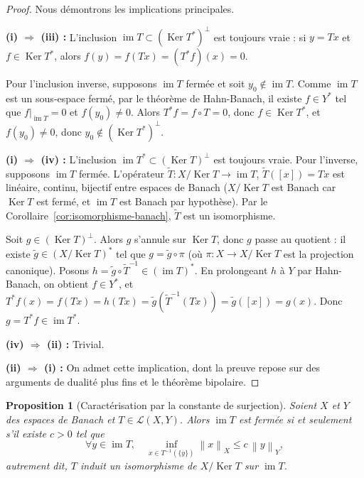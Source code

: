 \documentclass[a4paper,12pt]{book}
\DeclareMathOperator{\im}{im}
\DeclareMathOperator{\Ker}{Ker}
\newcommand{\norm}[1]{\left\| #1 \right\|}
\theoremstyle{definition}
\theoremstyle{plain}
\newtheorem{proposition}[definition]{Proposition}
\theoremstyle{remark}
\begin{document}
\begin{proof}
Nous démontrons les implications principales.

\textbf{(i) $\Rightarrow$ (iii) :}
L'inclusion $\im T \subset (\Ker T^*)^\perp$ est toujours vraie : si $y = Tx$
et $f \in \Ker T^*$, alors $f(y) = f(Tx) = (T^*f)(x) = 0$.

Pour l'inclusion inverse, supposons $\im T$ fermée et soit $y_0 \notin \im T$.
Comme $\im T$ est un sous-espace fermé, par le théorème de Hahn-Banach,
il existe $f \in Y^*$ tel que $f|_{\im T} = 0$ et $f(y_0) \neq 0$.
Alors $T^*f = f \circ T = 0$, donc $f \in \Ker T^*$, et $f(y_0) \neq 0$,
donc $y_0 \notin (\Ker T^*)^\perp$.

\textbf{(i) $\Rightarrow$ (iv) :}
L'inclusion $\im T^* \subset (\Ker T)^\perp$ est toujours vraie.
Pour l'inverse, supposons $\im T$ fermée. L'opérateur
$\tilde{T} : X / \Ker T \to \im T$, $\tilde{T}([x]) = Tx$ est linéaire,
continu, bijectif entre espaces de Banach ($X/\Ker T$ est Banach car
$\Ker T$ est fermé, et $\im T$ est Banach par hypothèse).
Par le Corollaire~\ref{cor:isomorphisme-banach}, $\tilde{T}$ est un isomorphisme.

Soit $g \in (\Ker T)^\perp$. Alors $g$ s'annule sur $\Ker T$, donc
$g$ passe au quotient : il existe $\tilde{g} \in (X/\Ker T)^*$ tel que
$g = \tilde{g} \circ \pi$ (où $\pi : X \to X/\Ker T$ est la projection
canonique). Posons $h = \tilde{g} \circ \tilde{T}^{-1} \in (\im T)^*$.
En prolongeant $h$ à $Y$ par Hahn-Banach, on obtient $f \in Y^*$, et
$T^*f(x) = f(Tx) = h(Tx) = \tilde{g}(\tilde{T}^{-1}(Tx)) = \tilde{g}([x]) = g(x)$.
Donc $g = T^*f \in \im T^*$.

\textbf{(iv) $\Rightarrow$ (ii) :} Trivial.

\textbf{(ii) $\Rightarrow$ (i) :}
On admet cette implication, dont la preuve repose sur des arguments de
dualité plus fins et le théorème bipolaire.
\end{proof}

\begin{proposition}[Caractérisation par la constante de surjection]
\label{prop:constante-surjection}
Soient $X$ et $Y$ des espaces de Banach et $T \in \mathcal{L}(X,Y)$. Alors
$\im T$ est fermée si et seulement s'il existe $c > 0$ tel que
\[
  \forall y \in \im T, \quad \inf_{x \in T^{-1}(\{y\})} \norm{x}_X \leq c\, \norm{y}_Y,
\]
autrement dit, $T$ induit un isomorphisme de $X / \Ker T$ sur $\im T$.
\end{proposition}
\end{document}
